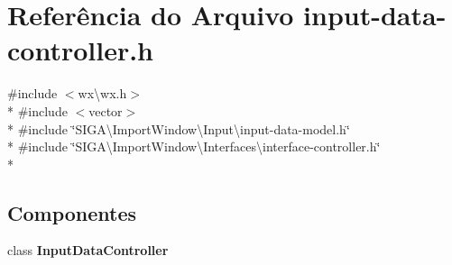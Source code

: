 \section{Referência do Arquivo input-\/data-\/controller.h}
\label{input-data-controller_8h}
{\ttfamily \#include $<$wx\textbackslash{}wx.\+h$>$}\\*
{\ttfamily \#include $<$vector$>$}\\*
{\ttfamily \#include \char`\"{}S\+I\+G\+A\textbackslash{}\+Import\+Window\textbackslash{}\+Input\textbackslash{}input-\/data-\/model.\+h\char`\"{}}\\*
{\ttfamily \#include \char`\"{}S\+I\+G\+A\textbackslash{}\+Import\+Window\textbackslash{}\+Interfaces\textbackslash{}interface-\/controller.\+h\char`\"{}}\\*
\subsection*{Componentes}
\begin{DoxyCompactItemize}
\item 
class {\bf Input\+Data\+Controller}
\end{DoxyCompactItemize}
